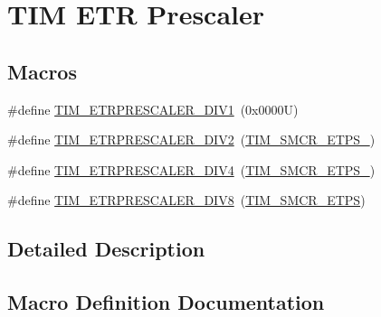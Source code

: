 \hypertarget{group___t_i_m___e_t_r___prescaler}{}\section{T\+IM E\+TR Prescaler}
\label{group___t_i_m___e_t_r___prescaler}
\subsection*{Macros}
\begin{DoxyCompactItemize}
\item 
\#define \hyperlink{group___t_i_m___e_t_r___prescaler_gabead5364c62645592e42545ba09ab88a}{T\+I\+M\+\_\+\+E\+T\+R\+P\+R\+E\+S\+C\+A\+L\+E\+R\+\_\+\+D\+I\+V1}~(0x0000\+U)
\item 
\#define \hyperlink{group___t_i_m___e_t_r___prescaler_gaf7fe49f67bdb6b33b9b41953fee75680}{T\+I\+M\+\_\+\+E\+T\+R\+P\+R\+E\+S\+C\+A\+L\+E\+R\+\_\+\+D\+I\+V2}~(\hyperlink{group___peripheral___registers___bits___definition_ga00b43cd09557a69ed10471ed76b228d8}{T\+I\+M\+\_\+\+S\+M\+C\+R\+\_\+\+E\+T\+P\+S\+\_})
\item 
\#define \hyperlink{group___t_i_m___e_t_r___prescaler_gaa09da30c3cd28f1fe6b6f3f599a5212c}{T\+I\+M\+\_\+\+E\+T\+R\+P\+R\+E\+S\+C\+A\+L\+E\+R\+\_\+\+D\+I\+V4}~(\hyperlink{group___peripheral___registers___bits___definition_gabf12f04862dbc92ca238d1518b27b16b}{T\+I\+M\+\_\+\+S\+M\+C\+R\+\_\+\+E\+T\+P\+S\+\_})
\item 
\#define \hyperlink{group___t_i_m___e_t_r___prescaler_ga834e38200874cced108379b17a24d0b7}{T\+I\+M\+\_\+\+E\+T\+R\+P\+R\+E\+S\+C\+A\+L\+E\+R\+\_\+\+D\+I\+V8}~(\hyperlink{group___peripheral___registers___bits___definition_ga0ebb9e631876435e276211d88e797386}{T\+I\+M\+\_\+\+S\+M\+C\+R\+\_\+\+E\+T\+PS})
\end{DoxyCompactItemize}


\subsection{Detailed Description}


\subsection{Macro Definition Documentation}
\mbox{\label{group___t_i_m___e_t_r___prescaler_gabead5364c62645592e42545ba09ab88a}} 
